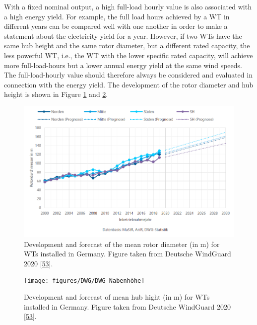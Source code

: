 \documentclass[a4paper,11pt]{article}
\begin{document}
With a fixed nominal output, a high full-load hourly value is also associated with a high energy yield. For example, the full load hours achieved by a WT in different years can be compared well with one another in order to make a statement about the electricity yield for a year. However, if two WTs have the same hub height and the same rotor diameter, but a different rated capacity, the less powerful WT, i.e., the WT with the lower specific rated capacity, will achieve more full-load-hours but a lower annual energy yield at the same wind speeds. The full-load-hourly value should therefore always be considered and evaluated in connection with the energy yield. The development of the rotor diameter and hub height is shown in Figure \ref{fig:rotor} and \ref{fig:nabe}.
\begin{figure}

{\centering \includegraphics[width=1\linewidth]{figures/DWG/DWG_Rotordurchmesser} 

}

\caption{Development and forecast of the mean rotor diameter (in m) for WTs installed in Germany. Figure taken from Deutsche WindGuard 2020 {[}\protect\hyperlink{ref-RasmusBorrmannDr.KnudRehfeldtDr.DennisKruse.2020}{53}{]}.}\label{fig:rotor}
\end{figure}
\begin{figure}[H]

{\centering \texttt{[image: figures/DWG/DWG\_Nabenhöhe]} 

}

\caption{Development and forecast of mean hub hight (in m) for WTs installed in Germany. Figure taken from Deutsche WindGuard 2020 {[}\protect\hyperlink{ref-RasmusBorrmannDr.KnudRehfeldtDr.DennisKruse.2020}{53}{]}.}\label{fig:nabe}
\end{figure}
\end{document}
